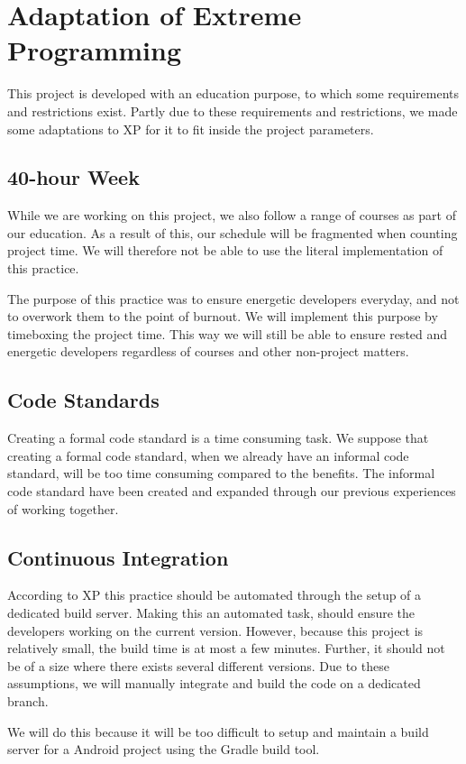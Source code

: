 \section{Adaptation of Extreme Programming}
This project is developed with an education purpose, to which some requirements and restrictions exist.
Partly due to these requirements and restrictions, we made some adaptations to XP for it to fit inside the project parameters.

\subsection{40-hour Week}
While we are working on this project, we also follow a range of courses as part of our education.
As a result of this, our schedule will be fragmented when counting project time.
We will therefore not be able to use the literal implementation of this practice.

The purpose of this practice was to ensure energetic developers everyday, and not to overwork them to the point of burnout.
We will implement this purpose by timeboxing the project time.
This way we will still be able to ensure rested and energetic developers regardless of courses and other non-project matters.

\subsection{Code Standards}
Creating a formal code standard is a time consuming task.
We suppose that creating a formal code standard, when we already have an informal code standard, will be too time consuming compared to the benefits.
The informal code standard have been created and expanded through our previous experiences of working together.

\subsection{Continuous Integration}
According to XP this practice should be automated through the setup of a dedicated build server.
Making this an automated task, should ensure the developers working on the current version.
However, because this project is relatively small, the build time is at most a few minutes.
Further, it should not be of a size where there exists several different versions.
Due to these assumptions, we will manually integrate and build the code on a dedicated branch.

We will do this because it will be too difficult to setup and maintain a build server for a Android project using the Gradle build tool. 

